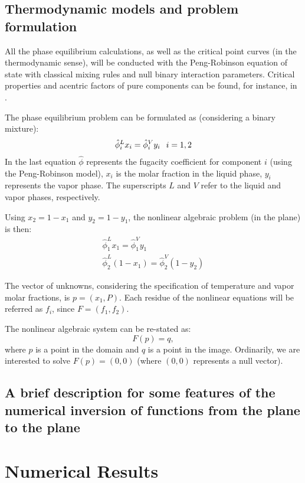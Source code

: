 \documentclass{article}
\theoremstyle{definition}
\theoremstyle{remark}
\begin{document}
\subsection{Thermodynamic models and problem formulation}

All the phase equilibrium calculations, as well as the critical point curves (in the thermodynamic sense), will be conducted with the Peng-Robinson equation of state with classical mixing rules and null binary interaction parameters. Critical properties and acentric factors of pure components can be found, for instance, in \cite{ireme}.

The phase equilibrium problem can be formulated as (considering a binary mixture):
\begin{eqnarray}
\hat{\phi}_i^L x_i = \hat{\phi}_i^V y_i \hspace{0.1in} i = 1,2
\end{eqnarray}
In the last equation $\hat{\phi}$ represents the fugacity coefficient for component $i$ (using the Peng-Robinson model), $x_i$ is the molar fraction in the liquid phase, $y_i$ represents the vapor phase. The superscripts $L$ and $V$ refer to the liquid and vapor phases, respectively.

Using $x_2 = 1 - x_1$ and $y_2 = 1 - y_1$, the nonlinear algebraic problem (in the plane) is then:
\begin{eqnarray}
\hat{\phi}_1^L x_1 = \hat{\phi}_1^V y_1 \\
\hat{\phi}_2^L (1-x_1) = \hat{\phi}_2^V (1-y_2)
\end{eqnarray}

The vector of unknowns, considering the specification of temperature and vapor molar fractions, is $p = (x_1,P)$. Each residue of the nonlinear equations will be referred as $f_i$, since $F = (f_1,f_2)$.

The nonlinear algebraic system can be re-stated as:
\begin{equation}
F(p) = q,
\end{equation}
where $p$ is a point in the domain and $q$ is a point in the image. Ordinarily, we are interested to solve $F(p) = (0,0)$ (where $(0,0)$ represents a null vector).

\subsection{A brief description for some features of the numerical inversion of functions from the plane to the plane}

\section{Numerical Results}
\end{document}
